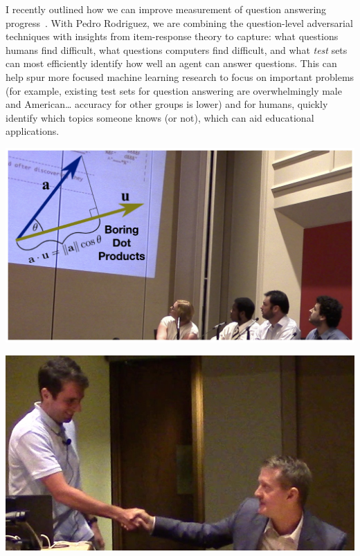 \documentclass[11pt]{amsart}
\begin{document}
I recently outlined how we can improve measurement of question
answering progress~\cite{boyd-graber-20}.  With Pedro Rodriguez, we
are combining the question-level adversarial techniques with insights
from item-response theory to capture: what questions humans find
difficult, what questions computers find difficult, and what
\emph{test} sets can most efficiently identify how well an agent can
answer questions.  This can help spur more focused machine learning
research to focus on important problems (for example, existing test
sets for question answering are overwhelmingly male and American\dots
accuracy for other groups is lower) and for humans, quickly identify
which topics someone knows (or not), which can aid educational
applications.

  \begin{minipage}[b]{0.4\textwidth}
    \includegraphics[width=\textwidth]{images/boring_dot_products}
  \end{minipage}
  \hfill
\begin{minipage}[b]{0.4\textwidth}
    \includegraphics[width=\textwidth]{images/jennings_handshake}
  \end{minipage}
\end{document}
